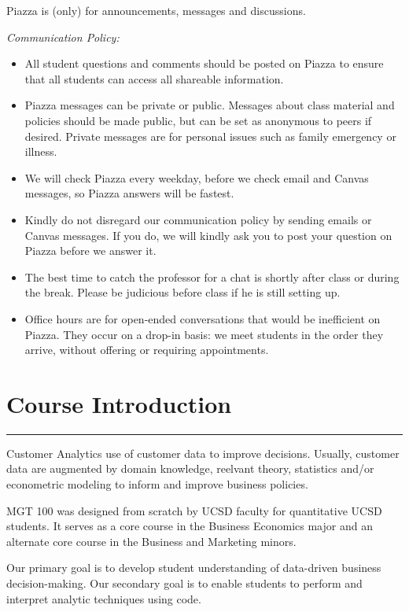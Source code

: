 \documentclass[12pt]{article}
\begin{document}
Piazza is (only) for announcements, messages and discussions.


{\it Communication Policy:} 
\vspace{-0.15cm}
\begin{itemize}[noitemsep]
\item All student questions and comments should be posted on Piazza to ensure that all students can access all shareable information. 
\item Piazza messages can be private or public. Messages about class material and policies should be made public, but can be set as anonymous to peers if desired. Private messages are for personal issues such as family emergency or illness. 
\item We will check Piazza every weekday, before we check email and Canvas messages, so Piazza answers will be fastest. 
\item Kindly do not disregard our communication policy by sending emails or Canvas messages. If you do, we will kindly ask you to post your question on Piazza before we answer it. 
\item The best time to catch the professor for a chat is shortly after class or during the break. Please be judicious before class if he is still setting up. 
\item Office hours are for open-ended conversations that would be inefficient on Piazza. They occur on a drop-in basis: we meet students in the order they arrive, without offering or requiring appointments. 
\end{itemize}


\section*{Course Introduction}

\medskip
\hrule
\medskip


Customer Analytics use of customer data to improve decisions. Usually, customer data are augmented by domain knowledge, reelvant theory, statistics and/or econometric modeling to inform and improve business policies.

MGT 100 was designed from scratch by UCSD faculty for quantitative UCSD students. It serves as a core course in the Business Economics major and an alternate core course in the Business and Marketing minors.

Our primary goal is to develop student understanding of data-driven business decision-making. Our secondary goal is to enable students to perform and interpret analytic techniques using code.
\end{document}
